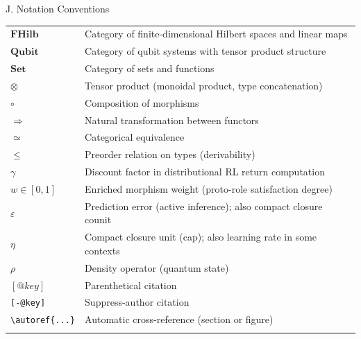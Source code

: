 \documentclass[
  ignorenonframetext,
]{beamer}
\begin{document}
\begin{frame}[fragile]{J. Notation Conventions}
{\begin{longtable}[]{@{}
  >{\raggedright\arraybackslash}p{}
  >{\raggedright\arraybackslash}p{}@{}}
\(\mathbf{FHilb}\) & Category of finite-dimensional Hilbert spaces and
linear maps \\
\(\mathbf{Qubit}\) & Category of qubit systems with tensor product
structure \\
\(\mathbf{Set}\) & Category of sets and functions \\
\(\otimes\) & Tensor product (monoidal product, type concatenation) \\
\(\circ\) & Composition of morphisms \\
\(\Rightarrow\) & Natural transformation between functors \\
\(\simeq\) & Categorical equivalence \\
\(\leq\) & Preorder relation on types (derivability) \\
\(\gamma\) & Discount factor in distributional RL return computation \\
\(w \in [0,1]\) & Enriched morphism weight (proto-role satisfaction
degree) \\
\(\varepsilon\) & Prediction error (active inference); also compact
closure counit \\
\(\eta\) & Compact closure unit (cap); also learning rate in some
contexts \\
\(\rho\) & Density operator (quantum state) \\
\([@key]\) & Parenthetical citation \\
\texttt{{[}-@key{]}} & Suppress-author citation \\
\texttt{\textbackslash{}autoref\{...\}} & Automatic cross-reference
(section or figure) \\
\bottomrule\noalign{}
\end{longtable}
}
\end{frame}
\end{document}
